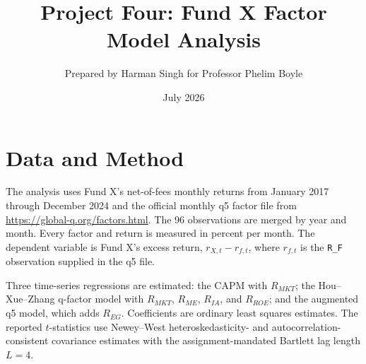 \documentclass[11pt]{article}
\title{Project Four: Fund X Factor Model Analysis}
\author{Prepared by Harman Singh for Professor Phelim Boyle}
\date{July 2026}
\begin{document}
\maketitle

\section*{Data and Method}
The analysis uses Fund X's net-of-fees monthly returns from January 2017 through
December 2024 and the official monthly q5 factor file from
\url{https://global-q.org/factors.html}. The 96 observations are merged by
year and month. Every factor and return is measured in percent per month. The
dependent variable is Fund X's excess return, $r_{X,t}-r_{f,t}$, where
$r_{f,t}$ is the \texttt{R\_F} observation supplied in the q5 file.

Three time-series regressions are estimated: the CAPM with $R_{MKT}$; the
Hou--Xue--Zhang q-factor model with $R_{MKT}$, $R_{ME}$, $R_{IA}$, and
$R_{ROE}$; and the augmented q5 model, which adds $R_{EG}$. Coefficients are
ordinary least squares estimates. The reported $t$-statistics use Newey--West
heteroskedasticity- and autocorrelation-consistent covariance estimates with
the assignment-mandated Bartlett lag length $L=4$.

\clearpage
\end{document}
